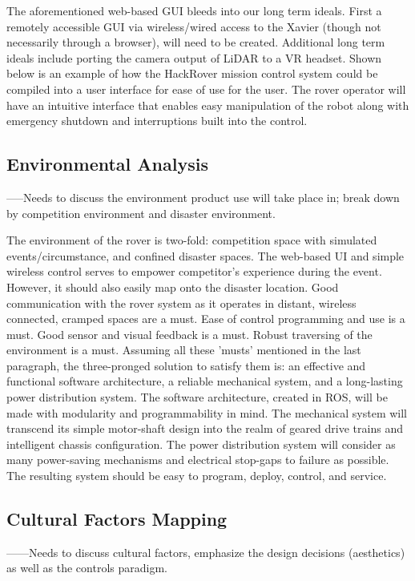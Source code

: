\documentclass[a4paper, 10pt]{article}
\begin{document}
The aforementioned web-based GUI bleeds into our long term ideals. First a remotely accessible GUI via wireless/wired access to the Xavier (though not necessarily through a browser), will need to be created. Additional long term ideals include porting the camera output of LiDAR to a VR headset. 
Shown below is an example of how the HackRover mission control system could be compiled into a user interface for ease of use for the user. The rover operator will have an intuitive interface that enables easy manipulation of the robot along with emergency shutdown and interruptions built into the control. 

	\subsection{Environmental Analysis}
	-----Needs to discuss the environment product use will take place in; break down by competition environment and disaster environment.
	
	The environment of the rover is two-fold: competition space with simulated events/circumstance, and confined disaster spaces. The web-based UI and simple wireless control serves to empower competitor's experience during the event. However, it should also easily map onto the disaster location. Good communication with the rover system as it operates in distant, wireless connected, cramped spaces are a must. Ease of control programming and use is a must. Good sensor and visual feedback is a must. Robust traversing of the environment is a must. 
Assuming all these 'musts' mentioned in the last paragraph, the three-pronged solution to satisfy them is: an effective and functional software architecture, a reliable mechanical system, and a long-lasting power distribution system. The software architecture, created in ROS, will be made with modularity and programmability in mind. The mechanical system will transcend its simple motor-shaft design into the realm of geared drive trains and intelligent chassis configuration. The power distribution system will consider as many power-saving mechanisms and electrical stop-gaps to failure as possible. The resulting system should be easy to program, deploy, control, and service.

	\subsection{Cultural Factors Mapping}
	------Needs to discuss cultural factors, emphasize the design decisions (aesthetics) as well as the controls paradigm. 	
	
\end{document}
